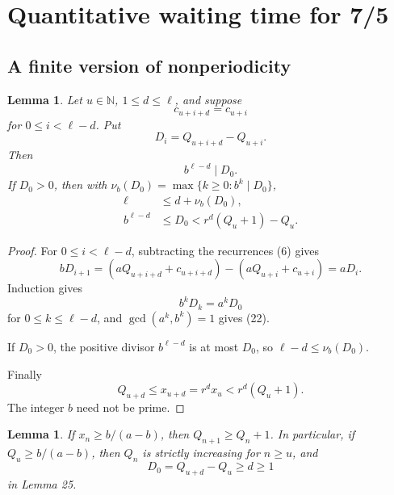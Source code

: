 \documentclass[11pt,reqno]{amsart}
\newtheorem{lemma}[theorem]{Lemma}
\theoremstyle{definition}
\theoremstyle{remark}
\begin{document}
\section{Quantitative waiting time for 7/5}\label{sec:6}

\subsection{A finite version of nonperiodicity}\label{sec:6.1}

\begin{samepage}
\begin{lemma}\leavevmode\label{thm:25}
Let \(u\in\mathbb N\), \(1\le d\le\ell\), and suppose
\[
c_{u+i+d}=c_{u+i}
\]
for \(0\le i<\ell-d\). Put
\[
D_i=Q_{u+i+d}-Q_{u+i}.
\]
Then
\[
b^{\ell-d}\mid D_0.
\tag{22}\label{eq:22}
\]
If \(D_0>0\), then with
\(\nu_b(D_0)=\max\{k\ge0:b^k\mid D_0\}\),
\[
\begin{aligned}
\ell&\le d+\nu_b(D_0),\\
b^{\ell-d}&\le D_0<r^d(Q_u+1)-Q_u.
\end{aligned}
\tag{23}\label{eq:23}
\]
\label{thm-end:25}
\end{lemma}
\end{samepage}

\begin{proof}\leavevmode\label{proof:25}
For \(0\le i<\ell-d\), subtracting the recurrences (6) gives
\[
bD_{i+1}=(aQ_{u+i+d}+c_{u+i+d})-(aQ_{u+i}+c_{u+i})=aD_i.
\]
Induction
gives
\[
b^kD_k=a^kD_0
\]
for \(0\le k\le\ell-d\), and
\(\gcd(a^k,b^k)=1\) gives (22).

If \(D_0>0\), the positive divisor
\(b^{\ell-d}\) is at most \(D_0\), so \(\ell-d\le\nu_b(D_0)\).

Finally
\[
Q_{u+d}\le x_{u+d}=r^dx_u<r^d(Q_u+1).
\]
The integer \(b\) need not be
prime. \qedhere
\end{proof}

\begin{samepage}
\begin{lemma}\leavevmode\label{thm:26}
If \(x_n\ge b/(a-b)\), then \(Q_{n+1}\ge Q_n+1\). In
particular, if \(Q_u\ge b/(a-b)\), then \(Q_n\) is strictly increasing
for \(n\ge u\), and
\[
D_0=Q_{u+d}-Q_u\ge d\ge1
\]
in Lemma 25.
\label{thm-end:26}
\end{lemma}
\end{samepage}
\end{document}
